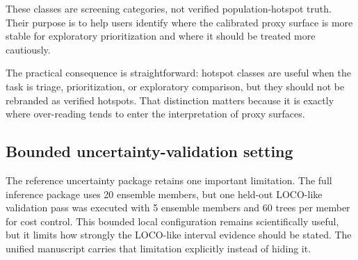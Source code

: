 These classes are screening categories, not verified population-hotspot truth. Their purpose is to help users identify where the calibrated proxy surface is more stable for exploratory prioritization and where it should be treated more cautiously.

The practical consequence is straightforward: hotspot classes are useful when the task is triage, prioritization, or exploratory comparison, but they should not be rebranded as verified hotspots. That distinction matters because it is exactly where over-reading tends to enter the interpretation of proxy surfaces.

\subsection{Bounded uncertainty-validation setting}

The reference uncertainty package retains one important limitation. The full inference package uses 20 ensemble members, but one held-out LOCO-like validation pass was executed with 5 ensemble members and 60 trees per member for cost control. This bounded local configuration remains scientifically useful, but it limits how strongly the LOCO-like interval evidence should be stated. The unified manuscript carries that limitation explicitly instead of hiding it.
